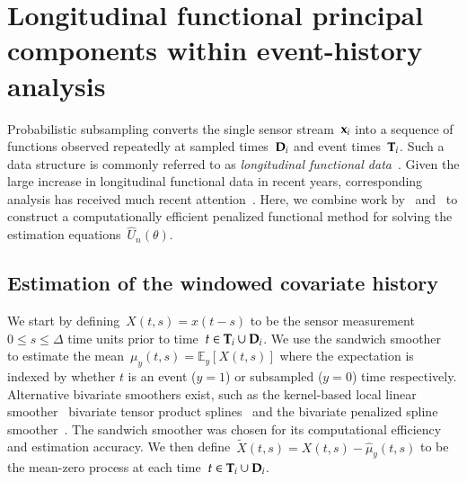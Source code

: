\documentclass[11pt]{amsart}
\def\E{\mathcal{E}}
\def\E{\mathbb{E}}
\def\bfx{{\bf x}}
\def\bfT{{\bf T}}
\def\bfD{{\bf D}}
\begin{document}
\section{Longitudinal functional principal components within
  event-history analysis}

Probabilistic subsampling converts the single sensor stream~$\bfx_i$ into a sequence of functions observed repeatedly at sampled times~$\bfD_i$ and event times~$\bfT_i$. Such a data structure is commonly referred to as \emph{longitudinal functional data}~\citep{Xiao2013, GoldSmith2015}. Given the large increase in longitudinal functional data in recent years, corresponding analysis has received much recent attention~\citep{Morris2003, MorrisCarroll2006, Baladandayuthapani2008, Di2009, Greven2010, Staicu2010, ChenMuller2012, LiGuan2014}. Here, we combine work by~\cite{Park2018} and~\cite{Goldsmith2011} to construct a computationally efficient penalized functional method for solving the estimation equations~$\hat U_n (\theta)$.

\subsection{Estimation of the windowed covariate history}

We start by defining~$X(t,s) = x(t-s)$ to be the sensor measurement~$0 \leq s \leq \Delta$ time units prior to time~$t \in \bfT_i \cup \bfD_i$. We use the sandwich smoother~\citep{Xiao2013} to estimate the mean~$\mu_y(t,s) = \E_y [ X(t,s)]$ where the expectation is indexed by whether $t$ is an event ($y=1$) or subsampled ($y=0$) time respectively. Alternative bivariate smoothers exist, such as the kernel-based local linear smoother~\citep{Hastie2009} bivariate tensor product splines~\citep{Wood2006} and the bivariate penalized spline smoother~\citep{MarxEilers2005}. The sandwich smoother was chosen for its computational efficiency and estimation accuracy. We then define~$\tilde X(t,s) = X(t,s) - \hat \mu_y(t,s)$ to be the mean-zero process at each time~$t \in \bfT_i \cup \bfD_i$.
\end{document}
